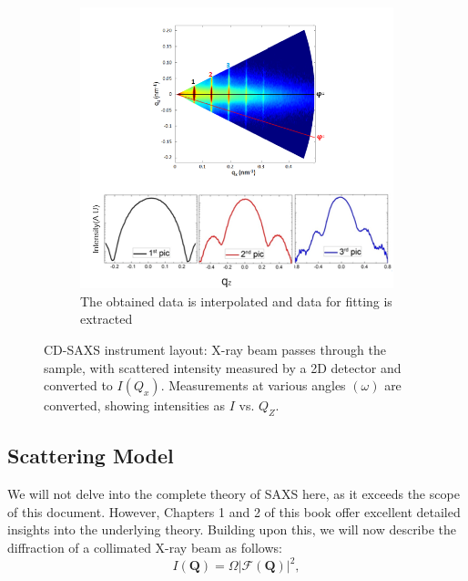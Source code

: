\begin{figure}[h]
    \begin{minipage}{0.5\textwidth}
        \centering
        \begin{subfigure}[b]{\textwidth}
            \includegraphics[width=\textwidth]{images/rotation.png}
            \caption{The obtained data is interpolated and data for fitting is extracted}
        \end{subfigure}
    
    \label{fig:exp_setup_concept}
    \end{minipage}
    
    \caption{CD-SAXS instrument layout: X-ray beam passes through the sample, with scattered 
    intensity measured by a 2D detector and converted to $I(Q_{x})$. Measurements at various 
    angles $(\omega)$ are converted, showing intensities as $I$ vs. $Q_{Z}$.}
    \label{fig:isolated_line}
\end{figure}

\FloatBarrier

\subsection{Scattering Model} \label{sec:scattering_model}

\medskip
We will not delve into the complete theory of SAXS here, as it exceeds the scope of this document. 
However, Chapters 1 and 2 of this book \cite{bookSaxs} offer excellent detailed insights into the underlying 
theory. Building upon this, we will now describe the diffraction of a collimated X-ray beam as follows:
\begin{equation}
    I(\mathbf{Q}) = \varOmega | \mathcal{F}(\mathbf{Q}) |^2,
\end{equation}

